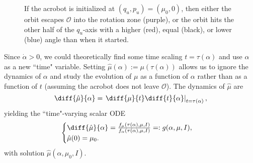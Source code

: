 \begin{figure}
    \centering 
    \caption{If the acrobot is initialized at \((q_u,p_u) = (\mu_0,0)\), then
        either the orbit escapes \(\mathcal{O}\) into the rotation
        zone (purple), or the orbit hits the other half of the \(q_u\)-axis 
        with a higher (red), equal (black), or lower (blue) angle than when it
        started.}
    \label{fig:acrobot-possible-orbits}
\end{figure}

Since \(\dot{\alpha} > 0\), we could theoretically find some time scaling 
\(t = \tau(\alpha)\) and use \(\alpha\) as a new ``time" variable.
Setting \(\hat{\mu}(\alpha) := \mu(\tau(\alpha))\) allows us to ignore the
dynamics of \(\alpha\) and study the evolution of \(\mu\) as a 
function of \(\alpha\) rather than as a function of \(t\) (assuming the acrobot
does not leave \(\mathcal{O}\)).
The dynamics of \(\hat{\mu}\) are
\[
    \diff{\hat{\mu}}{\alpha} = 
    \left.\diff{\mu}{t} \diff{t}{\alpha} \right|_{t =\tau(\alpha)}
    ,
\] 
yielding the ``time"-varying scalar ODE
\begin{equation}\label{eqn:muhat-dot}
    \begin{cases}
        \diff{\hat{\mu}}{\alpha} 
        = \frac{f_\mu(\tau(\alpha),\mu,I)}{f_\alpha(\tau(\alpha),\mu,I)}
        =: g(\alpha,\mu,I)
        , \\
        \hat{\mu}(0) = \mu_0
        .
    \end{cases}
\end{equation}
with solution \(\hat{\mu}(\alpha,\mu_0,I)\).


